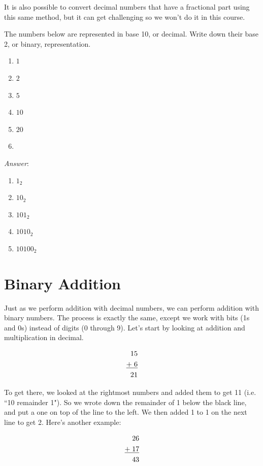 It is also possible to convert decimal numbers that have a fractional part using this same method, but it can get challenging so we won't do it in this course. 

\begin{example}
The numbers below are represented in base 10, or decimal. Write down their base 2, or binary, representation. 
\begin{enumerate}
\item $1$
\item $2$
\item $5$
\item $10$
\item $20$
\item 
\end{enumerate}
\noindent \emph{Answer}:
\begin{enumerate}
\item $1_{2}$
\item $10_{2}$
\item $101_{2}$
\item $1010_{2}$
\item $10100_{2}$
\end{enumerate}
\end{example}

\section{Binary Addition}
Just as we perform addition with decimal numbers, we can perform addition with
binary numbers. The process is exactly the same, except we work with bits (1s and 0s) instead of
digits (0 through 9). Let’s start by looking at addition and multiplication in decimal.

\begin{align*}
15&\\
\underline{+\hspace{1mm}6}&\\
21&\\
\end{align*}

To get there, we looked at the rightmost numbers and added them to get 11 (i.e. ``10 remainder 1"). So we wrote down the remainder of 1 below the black line, and put a one on top of the line to the left. We then added 1 to 1 on the next line to get 2. Here's another example: 

\begin{align*}
26&\\
\underline{+\hspace{1mm}17}&\\
43&\\
\end{align*}

